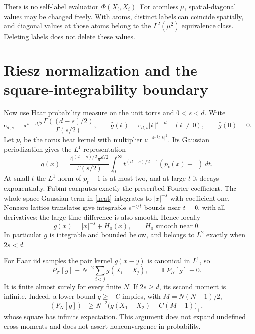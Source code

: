 \documentclass[11pt]{article}
\newcommand{\E}{\mathbb E}
\begin{document}
There is no self-label evaluation $\Phi(X_i,X_i)$. For atomless $\mu$,
spatial-diagonal values may be changed freely. With atoms, distinct labels
can coincide spatially, and diagonal values at those atoms belong to the
$L^2(\mu^2)$ equivalence class. Deleting labels does not delete these values.

\section{Riesz normalization and the square-integrability boundary}
Now use Haar probability measure on the unit torus and $0<s<d$. Write
\[
 c_{d,s}=\pi^{s-d/2}\frac{\Gamma((d-s)/2)}{\Gamma(s/2)},\qquad
 \widehat g(k)=c_{d,s}|k|^{s-d}\quad(k\ne0),\qquad \widehat g(0)=0.
\]
Let $p_t$ be the torus heat kernel with multiplier
$e^{-4\pi^2t|k|^2}$. Its Gaussian periodization gives the $L^1$ representation
\begin{equation}\label{heat}
 g(x)=\frac{4^{(d-s)/2}\pi^{d/2}}{\Gamma(s/2)}
       \int_0^\infty t^{(d-s)/2-1}(p_t(x)-1)\,dt.
\end{equation}
At small $t$ the $L^1$ norm of $p_t-1$ is at most two, and at large $t$ it
decays exponentially. Fubini computes exactly the prescribed Fourier
coefficient. The whole-space Gaussian term in \eqref{heat} integrates to
$|x|^{-s}$ with coefficient one. Nonzero lattice translates give integrable
$e^{-c/t}$ bounds near $t=0$, with all derivatives; the large-time difference
is also smooth. Hence locally
\[
 g(x)=|x|^{-s}+H_0(x),\qquad H_0\text{ smooth near }0.
\]
In particular $g$ is integrable and bounded below, and belongs to $L^2$
exactly when $2s<d$.

For Haar iid samples the pair kernel $g(x-y)$ is canonical in $L^1$, so
\[
 P_N[g]=N^{-2}\sum_{i<j}g(X_i-X_j),\qquad \E P_N[g]=0.
\]
It is finite almost surely for every finite $N$. If $2s\ge d$, its second
moment is infinite. Indeed, a lower bound $g\ge-C$ implies, with
$M=N(N-1)/2$,
\[
 (P_N[g])_+\ge N^{-2}\big(g(X_1-X_2)-C(M-1)\big)_+,
\]
whose square has infinite expectation. This argument does not expand
undefined cross moments and does not assert nonconvergence in probability.
\end{document}
